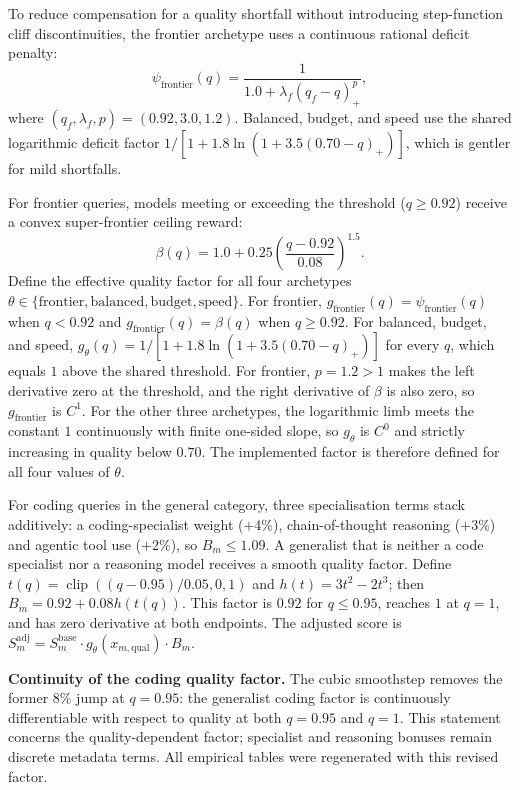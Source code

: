 \documentclass[pdflatex,sn-mathphys-num]{sn-jnl}
\theoremstyle{thmstyleone}
\theoremstyle{thmstylethree}
\begin{document}
To reduce compensation for a quality shortfall without introducing step-function cliff discontinuities, the frontier archetype uses a continuous rational deficit penalty:
\begin{equation}\label{eq:deficit_penalty}
\psi_{\text{frontier}}(q) = \frac{1}{1.0 + \lambda_f (q_f - q)_+^p},
\end{equation}
where $(q_f, \lambda_f, p) = (0.92, 3.0, 1.2)$. Balanced, budget, and speed use the shared logarithmic deficit factor $1/[1 + 1.8\ln(1 + 3.5(0.70-q)_+)]$, which is gentler for mild shortfalls.

For frontier queries, models meeting or exceeding the threshold ($q \ge 0.92$) receive a convex super-frontier ceiling reward:
\begin{equation}\label{eq:frontier_reward}
\beta(q) = 1.0 + 0.25 \left( \frac{q - 0.92}{0.08} \right)^{1.5}.
\end{equation}
Define the effective quality factor for all four archetypes $\theta\in\{\text{frontier},\text{balanced},\text{budget},\text{speed}\}$. For frontier, $g_{\text{frontier}}(q)=\psi_{\text{frontier}}(q)$ when $q<0.92$ and $g_{\text{frontier}}(q)=\beta(q)$ when $q\ge0.92$. For balanced, budget, and speed, $g_\theta(q)=1/[1+1.8\ln(1+3.5(0.70-q)_+)]$ for every $q$, which equals $1$ above the shared threshold. For frontier, $p=1.2>1$ makes the left derivative zero at the threshold, and the right derivative of $\beta$ is also zero, so $g_{\text{frontier}}$ is $C^1$. For the other three archetypes, the logarithmic limb meets the constant $1$ continuously with finite one-sided slope, so $g_\theta$ is $C^0$ and strictly increasing in quality below $0.70$. The implemented factor is therefore defined for all four values of $\theta$.

For coding queries in the general category, three specialisation terms stack additively: a coding-specialist weight ($+4\%$), chain-of-thought reasoning ($+3\%$) and agentic tool use ($+2\%$), so $B_m \le 1.09$. A generalist that is neither a code specialist nor a reasoning model receives a smooth quality factor. Define $t(q)=\operatorname{clip}((q-0.95)/0.05,0,1)$ and $h(t)=3t^2-2t^3$; then $B_m=0.92+0.08h(t(q))$. This factor is $0.92$ for $q\leq0.95$, reaches $1$ at $q=1$, and has zero derivative at both endpoints. The adjusted score is $S_m^{\text{adj}} = S_m^{\text{base}} \cdot g_\theta(x_{m, \text{qual}}) \cdot B_m$.

\textbf{Continuity of the coding quality factor.} The cubic smoothstep removes the former 8\% jump at $q=0.95$: the generalist coding factor is continuously differentiable with respect to quality at both $q=0.95$ and $q=1$. This statement concerns the quality-dependent factor; specialist and reasoning bonuses remain discrete metadata terms. All empirical tables were regenerated with this revised factor.
\end{document}
